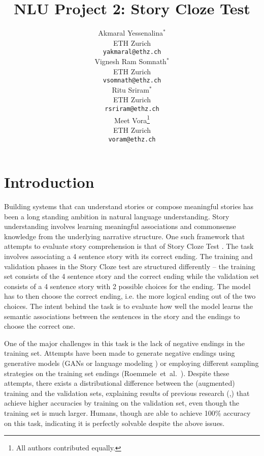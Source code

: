 \documentclass{article}
\title{NLU Project 2: Story Cloze Test}
\author{
  Akmaral Yessenalina$^\ast$\\
  ETH Zurich\\
  \texttt{yakmaral@ethz.ch}\\
  \And
  Vignesh Ram Somnath$^\ast$\\
  ETH Zurich\\
  \texttt{vsomnath@ethz.ch}\\
  \And
  Ritu Sriram$^\ast$\\
  ETH Zurich\\
  \texttt{rsriram@ethz.ch}\\
  \And
  Meet Vora\thanks{All authors contributed equally.}\\
  ETH Zurich\\
  \texttt{voram@ethz.ch}\\
}
\begin{document}

\maketitle


\section{Introduction}
Building systems that can understand stories or compose meaningful stories has been a long standing ambition in natural language understanding. Story understanding involves learning meaningful associations and commonsense knowledge from the underlying narrative structure. One such framework that attempts to evaluate story comprehension is that of Story Cloze Test \citep{Mostafazadeh2016AStories}. The task involves associating a 4 sentence story with its correct ending. The training and validation phases in the Story Cloze test are structured differently -- the training set consists of the 4 sentence story and the correct ending while the validation set consists of a 4 sentence story with 2 possible choices for the ending. The model has to then choose the correct ending, i.e. the more logical ending out of the two choices. The intent behind the task is to evaluate how well the model learns the semantic associations between the sentences in the story and the endings to choose the correct one. 

One of the major challenges in this task is the lack of negative endings in the training set. Attempts have been made to generate negative endings using generative models (GANs \citep{Wang2017ConditionalComprehension} or language modeling \citep{Roemmele2017AnTest}) or employing different sampling strategies on the training set endings (Roemmele\, et\, al.\ \citep{Roemmele2017AnTest}). Despite these attempts, there exists a distributional difference between the (augmented) training and the validation sets, explaining results of previous research (\citep{Srinivasan2018ATest},\citep{chaturvedi-etal-2017-story}) that achieve higher accuracies by training on the validation set, even though the training set is much larger. Humans, though are able to achieve 100\% accuracy on this task, indicating it is perfectly solvable despite the above issues.
 
\end{document}
